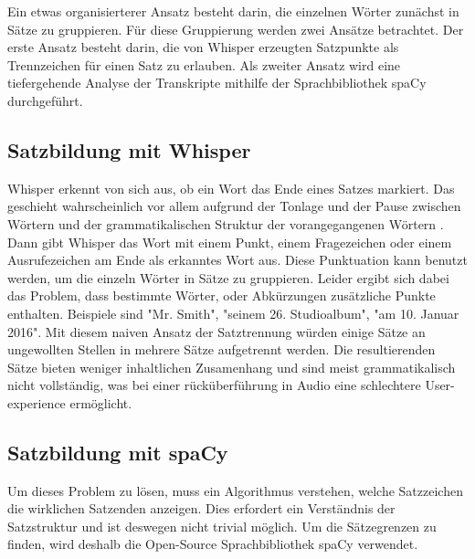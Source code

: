 Ein etwas organisierterer Ansatz besteht darin, die einzelnen Wörter zunächst in Sätze zu gruppieren.
Für diese Gruppierung werden zwei Ansätze betrachtet.
Der erste Ansatz besteht darin, die von Whisper erzeugten Satzpunkte als  Trennzeichen für einen Satz zu erlauben.
Als zweiter Ansatz wird eine tiefergehende Analyse der Transkripte mithilfe der Sprachbibliothek spaCy durchgeführt.

\subsection{Satzbildung mit Whisper}

Whisper erkennt von sich aus, ob ein Wort das Ende eines Satzes markiert.
Das geschieht wahrscheinlich vor allem aufgrund der Tonlage und der Pause zwischen Wörtern und der grammatikalischen Struktur der vorangegangenen Wörtern \cite{biron2021} \cite{radford}.
Dann gibt Whisper das Wort mit einem Punkt, einem Fragezeichen oder einem Ausrufezeichen am Ende als erkanntes Wort aus.
Diese Punktuation kann benutzt werden, um die einzeln Wörter in Sätze zu gruppieren.
Leider ergibt sich dabei das Problem, dass bestimmte Wörter, oder Abkürzungen zusätzliche Punkte enthalten.
Beispiele sind "Mr. Smith", "seinem 26. Studioalbum", "am 10. Januar 2016".
Mit diesem naiven Ansatz der Satztrennung würden einige Sätze an ungewollten Stellen in mehrere Sätze aufgetrennt werden.
Die resultierenden Sätze bieten weniger inhaltlichen Zusamenhang und sind meist grammatikalisch nicht vollständig, was bei einer rücküberführung in Audio eine schlechtere User-experience ermöglicht.


\subsection{Satzbildung mit spaCy}

Um dieses Problem zu lösen, muss ein Algorithmus verstehen, welche Satzzeichen die wirklichen Satzenden anzeigen.
Dies erfordert ein Verständnis der Satzstruktur und ist deswegen nicht trivial möglich.
Um die Sätzegrenzen zu finden, wird deshalb die Open-Source Sprachbibliothek spaCy verwendet.\cite{honnibal2017}

